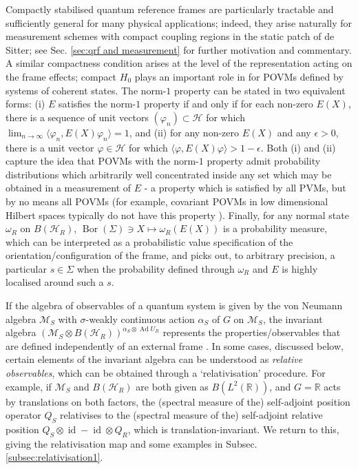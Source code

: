 \documentclass[sn-mathphys-num]{sn-jnl}%
\newcommand{\HH}{\mathcal{H}}
\DeclareMathOperator{\Bor}{Bor}
\DeclareMathOperator{\id}{id}
\DeclareMathOperator{\Ad}{Ad}
\numberwithin{equation}{section}
\theoremstyle{thmstyleone}%
\theoremstyle{thmstyletwo}%
\theoremstyle{thmstylethree}%
\begin{document}
     Compactly stabilised quantum reference frames are particularly tractable and sufficiently general for many physical applications; indeed, they arise naturally for measurement schemes with compact coupling regions in the static patch of de Sitter; see
      Sec. \ref{sec:qrf and measurement} for further motivation and commentary. A similar compactness condition arises at the level of the representation acting on the frame effects; compact $H_0$ plays an important role in \cite{de2021perspective} for POVMs defined by systems of coherent states. The norm-$1$ property can be stated in two equivalent forms: (i) $E$ satisfies the norm-$1$ property if and only if for each non-zero $E(X)$, there is a sequence of unit vectors $(\varphi_n)\subset \mathcal{H}$ for which 
     $\lim_{n \to \infty}\langle \varphi_n, E(X) \varphi_n \rangle = 1$, and (ii) for any non-zero $E(X)$ and any $\epsilon > 0$, there is a unit vector $\varphi \in  \mathcal{H}$ for which 
     $\langle \varphi, E(X) \varphi  \rangle > 1-\epsilon$. Both (i) and (ii) capture the idea that POVMs with the norm-$1$ property admit probability distributions which arbitrarily well concentrated inside any set which may be obtained in a measurement of $E$ - a property which is satisfied by all PVMs, but by no means all POVMs (for example, covariant POVMs in low dimensional Hilbert spaces typically do not have this property \cite{Loveridge2017a,carette2023operational}). Finally, for any normal state $\omega_R$ on $B(\HH_R)$, $\Bor(\Sigma) \ni X \mapsto \omega_R(E(X))$ is a probability measure, which can be interpreted as a probabilistic value specification of the orientation/configuration of the frame, and picks out, to arbitrary precision, a particular $s \in \Sigma$ when the probability defined through $\omega_R$ and $E$ is highly localised around such a $s$.



 If the algebra of observables of a quantum system is given by the von Neumann algebra $\mathcal{M}_S$ with $\sigma$-weakly continuous action $\alpha_S$ of $G$ on $\mathcal{M}_S$, the invariant algebra $(\mathcal{M}_S \otimes B(\mathcal{H}_R))^{\alpha_S \otimes \Ad U_R}$ represents the properties/observables that are defined independently of an external frame \cite{Loveridge2017a,carette2023operational}. In some cases, discussed below, certain elements of the invariant algebra can be understood as \emph{relative observables}, which can be obtained through a `relativisation' procedure. For example, if $\mathcal{M}_S$ and $B(\mathcal{H}_R)$ are both given as $B(L^2(\mathbb{R}))$, and $G = \mathbb{R}$ acts by translations on both factors, the (spectral measure of the) self-adjoint position operator $Q_S$ relativises to the (spectral measure of the) self-adjoint relative position $Q_S \otimes \id  - \id \otimes Q_R$, which is translation-invariant. We return to this, giving the relativisation map and some examples in Subsec. \ref{subsec:relativisation1}.
\end{document}
